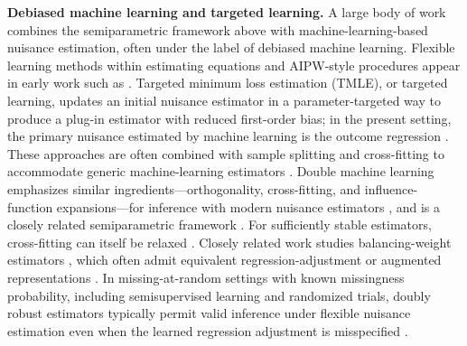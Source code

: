 \documentclass{article}
\theoremstyle{plain}
\theoremstyle{definition}
\newcommand{\1}{\mathbbm{1}}
\begin{document}
\textbf{Debiased machine learning and targeted learning.}
A large body of work combines the semiparametric framework above with machine-learning-based nuisance estimation, often under the label of debiased machine learning. Flexible learning methods within estimating equations and AIPW-style procedures appear in early work such as \citet{vanderlaanunified}. Targeted minimum loss estimation (TMLE), or targeted learning, updates an initial nuisance estimator in a parameter-targeted way to produce a plug-in estimator with reduced first-order bias; in the present setting, the primary nuisance estimated by machine learning is the outcome regression \citep{van2006targeted,vanderLaanRose2011,gruber2009targeted,hoffman2020tmle,ross2025constructing}. These approaches are often combined with sample splitting and cross-fitting to accommodate generic machine-learning estimators \citep{schick1986asymptotically,klaassen1987consistent,zheng2010asymptotic,vanderLaanRose2011,DoubleML}. Double machine learning emphasizes similar ingredients---orthogonality, cross-fitting, and influence-function expansions---for inference with modern nuisance estimators \citep{DoubleML,chernozhukov2022automatic}, and is a closely related semiparametric framework \citep{vanderlaan2019cvtmle,diaz2020machine,chen2026equivalence}. For sufficiently stable estimators, cross-fitting can itself be relaxed \citep{chen2022stable}. Closely related work studies balancing-weight estimators \citep{hainmueller2012entropy,imai2014covariate,zubizarreta2015stable,lendle2015balancing,chattopadhyay2020balancing,hejazi2023revisiting}, which often admit equivalent regression-adjustment or augmented representations \citep{chattopadhyay2023implied,bruns2025augmented,rotnitzky2025note}. In missing-at-random settings with known missingness probability, including semisupervised learning and randomized trials, doubly robust estimators typically permit valid inference under flexible nuisance estimation even when the learned regression adjustment is misspecified \citep{moore2009covariate,moore2009increasing,rosenblum2009using,hojbjerre2025powering,hojbjerre2026within}.
\end{document}
